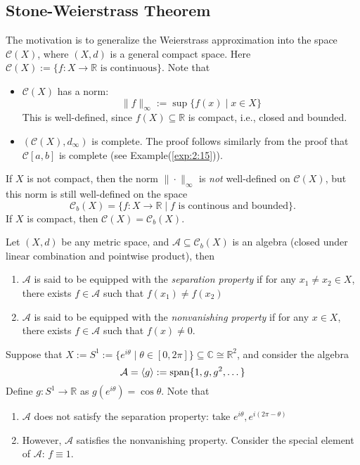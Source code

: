 \subsection{Stone-Weierstrass Theorem}
The motivation is to generalize the Weierstrass approximation into the space $\mathcal{C}(X)$, where $(X,d)$ is a general compact space. 
Here $\mathcal{C}(X):=\{f:X\to\mathbb{R}\text{ is continuous}\}$. Note that
\begin{itemize}
\item
$\mathcal{C}(X)$ has a norm:
\[
\|f\|_\infty :=\sup\{f(x)\mid x\in X\}
\]
This is well-defined, since $f(X)\subseteq\mathbb{R}$ is compact, i.e., closed and bounded.
\item
$(\mathcal{C}(X),d_\infty)$ is complete. The proof follows similarly from the proof that $\mathcal{C}[a,b]$ is complete (see Example(\ref{exp:2:15})).
\end{itemize}
\begin{remark}
If $X$ is not compact, then the norm $\|\cdot\|_\infty$ is \emph{not} well-defined on $\mathcal{C}(X)$, but this norm is still well-defined on the space
\[
\mathcal{C}_{b}(X)=\{f:X\to\mathbb{R}\mid \text{$f$ is continous and bounded}\}.
\]
If $X$ is compact, then $\mathcal{C}(X)=\mathcal{C}_{b}(X)$.
\end{remark}

\begin{definition}
Let $(X,d)$ be any metric space, and $\mathcal{A}\subseteq\mathcal{C}_b(X)$ is an algebra (closed under linear combination and pointwise product), then 
\begin{enumerate}
\item
$\mathcal{A}$ is said to be equipped with the \emph{separation property} if for any $x_1\ne x_2\in X$, there exists $f\in\mathcal{A}$ such that $f(x_1)\ne f(x_2)$
\item
$\mathcal{A}$ is said to be equipped with the \emph{nonvanishing property} if for any $x\in X$, there exists $f\in\mathcal{A}$ such that $f(x)\ne0$.
\end{enumerate}
\end{definition}
\begin{example}
Suppose that $X:=S^1:=\{e^{i\theta}\mid\theta\in[0,2\pi]\}\subseteq\mathbb{C}\cong\mathbb{R}^2$, and consider the algebra
\[
\mathcal{A}=\langle g\rangle:=\operatorname{span}\{1,g,g^2,\dots\}
\]
Define $g:S^1\to\mathbb{R}$ as $g(e^{i\theta}) = \cos\theta$. Note that
\begin{enumerate}
\item
$\mathcal{A}$ does not satisfy the separation property: take $e^{i\theta},e^{i(2\pi-\theta)}$
\item
However, $\mathcal{A}$ satisfies the nonvanishing property. Consider the special element of $\mathcal{A}$: $f\equiv1$.
\end{enumerate}
\end{example}



